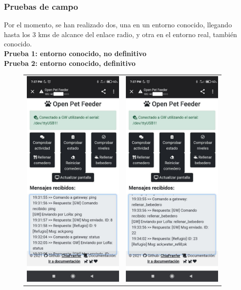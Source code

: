 \documentclass[12pt]{article}
\begin{document}
	\subsubsection{Pruebas de campo}
	
	\noindent Por el momento, se han realizado dos, una en un entorno conocido, llegando hasta los 3 kms de alcance del enlace radio, y otra en el entorno real, también conocido. \\
	
	\noindent \textbf{Prueba 1: entorno conocido, no definitivo} \\
	
	\noindent \textbf{Prueba 2: entorno conocido, definitivo} \\

	\begin{figure}[h!]
		\begin{center}
			\begin{tabular}{cc}
				\includegraphics[width=50mm]{img/captura_web_cobertura_2.jpg} &   \includegraphics[width=50mm]{img/captura_web_cobertura_1.jpg} \\

\end{tabular}
\end{center}
\end{figure}
\end{document}
